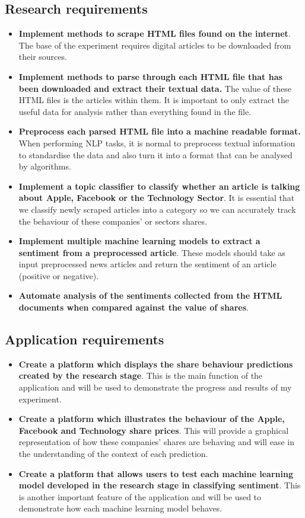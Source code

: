 \documentclass[a4paper,11pt]{report}
\begin{document}
\subsection {Research requirements}
\begin{itemize}
		\item \textbf{Implement methods to scrape HTML files found on the internet}. The base of the experiment requires digital articles to be downloaded from their sources.
		\item \textbf{Implement methods to parse through each HTML file that has been downloaded and extract their textual data.} The value of these HTML files is the articles within them. It is important to only extract the useful data for analysis rather than everything found in the file.
    \item \textbf{Preprocess each parsed HTML file into a machine readable format.} When performing NLP tasks, it is normal to preprocess textual information to standardise the data and also turn it into a format that can be analysed by algorithms.
    \item \textbf{Implement a topic classifier to classify whether an article is talking about Apple, Facebook or the Technology Sector}. It is essential that we classify newly scraped articles into a category so we can accurately track the behaviour of these companies' or sectors shares.
    \item \textbf{Implement multiple machine learning models to extract a sentiment from a preprocessed article}. These models should take as input preprocessed news articles and return the sentiment of an article (positive or negative).
    \item \textbf{Automate analysis of the sentiments collected from the HTML documents when compared against the value of shares}.
\end{itemize}

\subsection {Application requirements}
\begin{itemize}
  \item \textbf{Create a platform which displays the share behaviour predictions created by the research stage}. This is the main function of the application and will be used to demonstrate the progress and results of my experiment.
    \item \textbf{Create a platform which illustrates the behaviour of the Apple, Facebook and Technology share prices}. This will provide a graphical representation of how these companies' shares are behaving and will ease in the understanding of the context of each prediction.
    \item \textbf{Create a platform that allows users to test each machine learning model developed in the research stage in classifying sentiment}. This is another important feature of the application and will be used to demonstrate how each machine learning model behaves.
\end{itemize}
\end{document}
